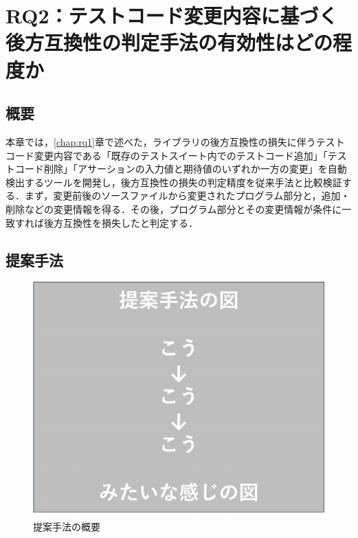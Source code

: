 \documentclass[11pt,dvipdfmx]{jreport}
\begin{document}
\chapter{RQ2：テストコード変更内容に基づく後方互換性の判定手法の有効性はどの程度か}\label{chap:rq2}

\section{概要}
本章では，\ref{chap:rq1}章で述べた，ライブラリの後方互換性の損失に伴うテストコード変更内容である「既存のテストスイート内でのテストコード追加」「テストコード削除」「アサーションの入力値と期待値のいずれか一方の変更」を自動検出するツールを開発し，後方互換性の損失の判定精度を従来手法と比較検証する．まず，変更前後のソースファイルから変更されたプログラム部分と，追加・削除などの変更情報を得る．その後，プログラム部分とその変更情報が条件に一致すれば後方互換性を損失したと判定する．

\section{提案手法}\label{sec:rq2.teian}

\begin{figure}[t]
  \label{fig:rq2.syuhou}
  \centering
  \includegraphics[width=1.0\linewidth]{fig/teiannshuhou.pdf}
  \caption{提案手法の概要}
\end{figure}
\end{document}
